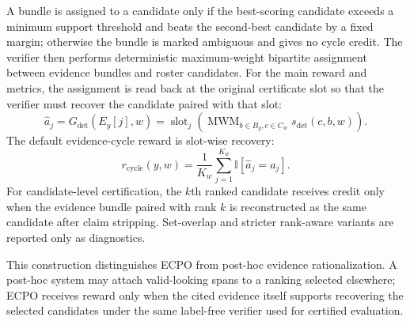 \documentclass{article}
\newcommand{\Gdet}{G_{\mathrm{det}}}
\begin{document}
A bundle is assigned to a candidate only if the best-scoring candidate exceeds a minimum support threshold and beats the second-best candidate by a fixed margin; otherwise the bundle is marked ambiguous and gives no cycle credit. The verifier then performs deterministic maximum-weight bipartite assignment between evidence bundles and roster candidates. For the main reward and metrics, the assignment is read back at the original certificate slot so that the verifier must recover the candidate paired with that slot:
\begin{equation}
\hat a_j=\Gdet(E_y[j],w)=\operatorname{slot}_j\!\left(\operatorname{MWM}_{b\in B_y,c\in C_w}s_{\mathrm{det}}(c,b,w)\right).
\end{equation}
The default evidence-cycle reward is slot-wise recovery:
\begin{equation}
r_{\mathrm{cycle}}(y,w)=\frac{1}{K_w}\sum_{j=1}^{K_w}\mathbb{I}[\hat a_j=a_j].
\end{equation}
For candidate-level certification, the $k$th ranked candidate receives credit only when the evidence bundle paired with rank $k$ is reconstructed as the same candidate after claim stripping. Set-overlap and stricter rank-aware variants are reported only as diagnostics.

This construction distinguishes ECPO from post-hoc evidence rationalization. A post-hoc system may attach valid-looking spans to a ranking selected elsewhere; ECPO receives reward only when the cited evidence itself supports recovering the selected candidates under the same label-free verifier used for certified evaluation.
\end{document}
